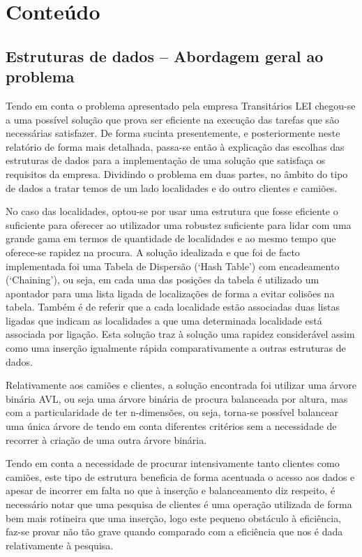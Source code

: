 \documentclass[a5paper,twocolumn, 11pt]{article}
\def\hyph{-\penalty0\hskip0pt\relax}
\begin{document}
\clearpage
\section{Conteúdo}
\subsection[Estruturas de dados]{Estruturas de dados -- Abordagem geral ao problema}
\label{abordagem geral}
Tendo em conta o problema apresentado pela empresa Transitários LEI chegou-se a uma possível solução que prova ser eficiente na execução das tarefas que são necessárias satisfazer. De forma sucinta presentemente, e posteriormente neste relatório de forma mais detalhada, passa-se então à explicação das escolhas das estruturas de dados para a implementação de uma solução que satisfaça os requisitos da empresa. Dividindo o problema em duas partes, no âmbito do tipo de dados a tratar temos de um lado localidades e do outro clientes e camiões.

No caso das localidades, optou-se por usar uma estrutura que fosse eficiente o suficiente para oferecer ao utilizador uma robustez suficiente para lidar com uma grande gama em termos de quantidade de localidades e ao mesmo tempo que oferece-se rapidez na procura. A solução idealizada e que foi de facto implementada foi uma Tabela de Dispersão (‘Hash Table’) com encadeamento (‘Chaining’), ou seja, em cada uma das posições da tabela é utilizado um apontador para uma lista ligada de localizações de forma a evitar colisões na tabela. Também é de referir que a cada localidade estão associadas duas listas ligadas que indicam as localidades a que uma determinada localidade está associada por ligação. Esta solução traz à solução uma rapidez considerável assim como uma inserção igualmente rápida comparativamente a outras estruturas de dados.

Relativamente aos camiões e clientes, a solução encontrada foi utilizar uma árvore binária AVL, ou seja uma árvore binária de procura balanceada por altura, mas com a particularidade de ter n\hyph{}dimensões, ou seja, torna-se possível balancear uma única árvore de tendo em conta diferentes critérios sem a necessidade de recorrer à criação de uma outra árvore binária.

Tendo em conta a necessidade de procurar intensivamente tanto clientes como camiões, este tipo de estrutura beneficia de forma acentuada o acesso aos dados e apesar de incorrer em falta no que à inserção e balanceamento diz respeito, é necessário notar que uma pesquisa de clientes é uma operação utilizada de forma bem mais rotineira que uma inserção, logo este pequeno obstáculo à eficiência, faz-se provar não tão grave quando comparado com a eficiência que nos é dada relativamente à pesquisa.
\end{document}
